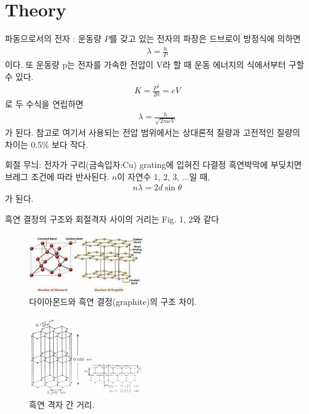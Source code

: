 \documentclass[a4paper, 10pt, nanum]{CSUniSchoolLabReport}
\begin{document}

\section{Theory}

	파동으로서의 전자 : 운동량 $P$를 갖고 있는 전자의 파장은 드브로이 방정식에 의하면
	\begin{align}
		\lambda = \frac{h}{P}
	\end{align}
	이다. 또 운동량 p는 전자를 가속한 전압이 V라 할 때 운동 에너지의 식에서부터 구할 수 있다.
	\begin{align}
		K = \frac{P^2}{20} = eV
	\end{align}
	로 두 수식을 연립하면
	\begin{align}
		\lambda = \frac{h}{\sqrt{2meV}}
	\end{align}
	가 된다. 참고로 여기서 사용되는 전압 범위에서는 상대론적 질량과 고전적인 질량의 차이는 0.5\% 보다 작다.

	회절 무늬: 전자가 구리(금속입자:Cu) grating에 입혀진 다결정 흑연박막에 부딪치면 브레그 조건에 따라 반사된다. $n$이 자연수 1, 2, 3, ...일 때,
	\begin{align}
		n\lambda = 2d \sin\theta
	\end{align}
	가 된다.

	흑연 결정의 구조와 회절격자 사이의 거리는 Fig. 1, 2와 같다
	\begin{figure}[ht!]
		\centering
		\includegraphics[width=5cm]{Figures/diamond-graphite.png}
		\caption{다이아몬드와 흑연 결정(graphite)의 구조 차이.}
		\label{fig:diamond-graphite}
	\end{figure}
	\begin{figure}[ht!]
		\centering
		\includegraphics[width=5cm]{Figures/graphite.png}
		\caption{흑연 격자 간 거리.}
		\label{fig:graphite}
	\end{figure}
\end{document}
